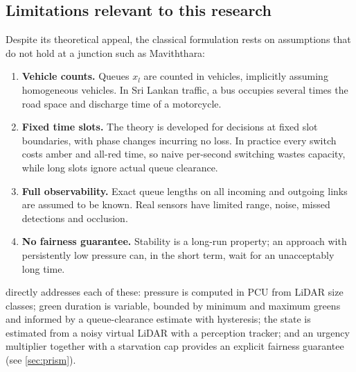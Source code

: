 \subsection{Limitations relevant to this research}
Despite its theoretical appeal, the classical formulation rests on assumptions that do not hold at a junction
such as Maviththara:
\begin{enumerate}[leftmargin=*,itemsep=2pt]
  \item \textbf{Vehicle counts.} Queues $x_l$ are counted in vehicles, implicitly assuming homogeneous vehicles.
        In Sri Lankan traffic, a bus occupies several times the road space and discharge time of a motorcycle.
  \item \textbf{Fixed time slots.} The theory is developed for decisions at fixed slot boundaries, with phase
        changes incurring no loss. In practice every switch costs amber and all-red time, so naive per-second
        switching wastes capacity, while long slots ignore actual queue clearance.
  \item \textbf{Full observability.} Exact queue lengths on all incoming and outgoing links are assumed to be
        known. Real sensors have limited range, noise, missed detections and occlusion.
  \item \textbf{No fairness guarantee.} Stability is a long-run property; an approach with persistently low
        pressure can, in the short term, wait for an unacceptably long time.
\end{enumerate}
\prism{} directly addresses each of these: pressure is computed in PCU from LiDAR size classes; green duration
is variable, bounded by minimum and maximum greens and informed by a queue-clearance estimate with hysteresis;
the state is estimated from a noisy virtual LiDAR with a perception tracker; and an urgency multiplier together
with a starvation cap provides an explicit fairness guarantee (see \cref{sec:prism}).

